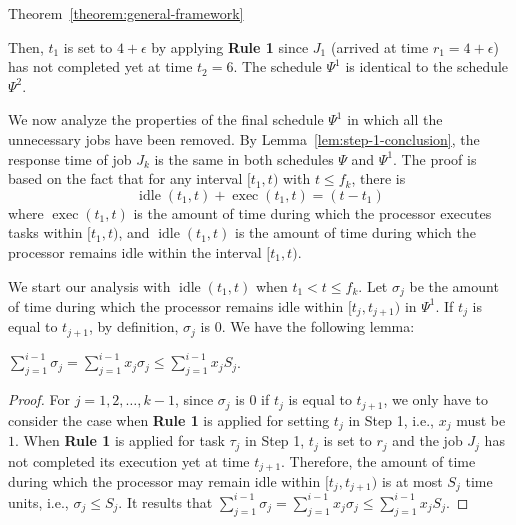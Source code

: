 \begin{appProof}{Theorem~\ref{theorem:general-framework}}
\begin{example}
Then, $t_1$ is set to $4+\epsilon$ by applying {\bf Rule 1} since
$J_1$ (arrived at time $r_1=4+\epsilon$) has not completed yet at time
$t_2=6$.  The schedule $\Psi^1$ is identical to the schedule
$\Psi^2$.
\myendproof
\end{example}


We now analyze the properties of the final schedule $\Psi^1$ in which all the unnecessary jobs have been removed. By Lemma~\ref{lem:step-1-conclusion}, the response time of job $J_k$ is the same in both schedules $\Psi$ and $\Psi^1$.
The proof is based on the fact that for any interval $[t_1, t)$ with $t \leq f_k$, there is 
\begin{equation}
\label{eq:exec_plus_idle}
\operatorname{idle}(t_1, t) + \operatorname{exec}(t_1, t)  = (t - t_1)
\end{equation}
where $\operatorname{exec}(t_1, t)$ is the amount of time during which the processor executes tasks within $[t_1, t)$, and $\operatorname{idle}(t_1, t)$ is the amount of time during which the processor remains idle within the interval $[t_1, t)$.





We start our analysis with $\operatorname{idle}(t_1, t)$ when $t_1 < t \leq f_k$.
Let $\sigma_j$ be the amount of time during which the processor remains idle within $[t_j, t_{j+1})$ in $\Psi^1$. If $t_j$ is equal to $t_{j+1}$, by definition, $\sigma_j$ is $0$.
We have the following lemma:
\begin{Lemma}
\label{lem:max_idle}
$\sum_{j=1}^{i-1} \sigma_j  = \sum_{j=1}^{i-1} x_j \sigma_j\leq \sum_{j=1}^{i-1} x_j S_j$. %
\end{Lemma}
\begin{proof}
  For $j=1,2,\ldots,k-1$, 
  since $\sigma_j$ is $0$ if $t_j$ is equal to $t_{j+1}$, we only have
  to consider the case when {\bf Rule 1} is applied for setting $t_j$
  in Step 1, i.e., $x_j$ must be $1$.  When {\bf Rule 1} is applied for task $\tau_j$ in Step 1, $t_j$ is set to $r_j$ and
  the job $J_j$ has not completed its execution yet at time $t_{j+1}$. Therefore, the
  amount of time during which the processor may remain idle within
  $[t_j, t_{j+1})$ is at most $S_j$ time units, i.e., $\sigma_j \leq S_j$.   It results that
  $\sum_{j=1}^{i-1} \sigma_j = \sum_{j=1}^{i-1} x_j \sigma_j \leq
  \sum_{j=1}^{i-1} x_j S_j$.
\end{proof}


\end{appProof}
